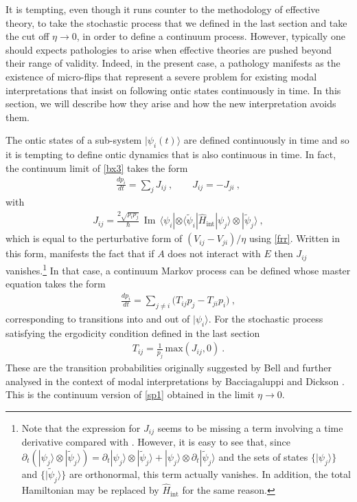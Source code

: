\documentclass[%
preprint,
nofootinbib,
 amsmath,amssymb,
aps,
]{revtex4-1}
\newcommand{\IM}{\operatorname{Im}}
\def\bra#1{\langle #1|}
\def\ket#1{| #1\rangle}
\newcommand{\EQ}[1]{\begin{equation}\begin{split} #1
\end{split}\end{equation}}
\begin{document}
It is tempting, even though it runs counter to the methodology of effective theory, to take the stochastic process that we defined in the last section and take the cut off $\eta\to0$, in order to define a continuum process. 
However, typically one should expects pathologies to arise when effective theories are pushed beyond their range of validity. Indeed, in the present case, a pathology manifests as 
the existence of micro-flips that represent a severe problem for existing modal interpretations that insist on following ontic states continuously in time. In this section, we will describe how they arise and how the new interpretation  avoids them.

The ontic states of a sub-system $\ket{\psi_i(t)}$ are defined continuously in time and so it is tempting to define ontic dynamics that is also continuous in time. In fact, the continuum limit of \eqref{bx3} takes the form
\EQ{
\frac{dp_i}{dt}=\sum_jJ_{ij}\ ,\qquad J_{ij}=-J_{ji}\ ,
\label{ge1}
}
with
\EQ{
J_{ij}=\frac{2\sqrt{p_ip_j}}\hbar\,\IM\,\bra{\psi_i}\otimes\bra{\tilde\psi_i}\hat H_\text{int}\ket{\psi_j}\otimes\ket{\tilde\psi_j}\ ,
\label{eqj}
}
which is equal to the perturbative form of $(V_{ij}-V_{ji})/\eta$ using \eqref{frr}.
Written in this form, manifests the fact that if $A$ does not interact with $E$ then  $J_{ij}$ vanishes.\footnote{Note that the expression for $J_{ij}$ seems to be missing a term involving a time derivative compared with \cite{Hollowood:2013cbr,BacciagaluppiDickson:1999dmi}. However, it is easy to see that, since $\partial_t(\ket{\psi_j}\otimes\ket{\tilde\psi_j})=\partial_t\ket{\psi_j}\otimes\ket{\tilde\psi_j}+\ket{\psi_j}\otimes\partial_t\ket{\tilde\psi_j}$ and the sets of states $\{\ket{\psi_j}\}$ and $\{\ket{\tilde\psi_j}\}$ are orthonormal, this term actually vanishes. In addition, the total Hamiltonian may be replaced by $\hat H_\text{int}$ for the same reason.}
In that case, a continuum Markov process can be defined whose master equation takes the form
\EQ{
\frac{dp_i}{dt}=\sum_{j\neq i}\Big(T_{ij}p_j-T_{ji}p_i\Big)\ ,
\label{ge2}
}
corresponding to transitions into and out of  $\ket{\psi_i}$. For the stochastic process satisfying the ergodicity condition defined in the last section
\EQ{
T_{ij}=\frac1{p_j}\,\text{max}\left(J_{ij},0\right)\ .
\label{trt}
}
These are the transition probabilities originally suggested by Bell \cite{Bell:2004suqm} and further analysed in the context of modal interpretations by Bacciagaluppi and Dickson \cite{BacciagaluppiDickson:1999dmi}. This is the continuum version of \eqref{sp1} obtained in the limit $\eta\to0$. 
\end{document}
